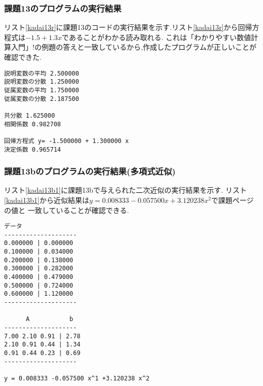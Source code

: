 \documentclass[a4j]{jarticle}
\begin{document}
      \subsubsection{課題13のプログラムの実行結果}
      リスト\ref{kadai13r}に課題13のコードの実行結果を示す.リスト\ref{kadai13r}から回帰方程式は$-1.5+1.3x$であることがわかる読み取れる.
      これは「わかりやすい数値計算入門」!の例題の答えと一致しているから,作成したプログラムが正しいことが確認できた.
      \begin{lstlisting}[basicstyle=\ttfamily\footnotesize, frame=single,label=kadai13r,caption=課題13のプログラムの実行結果]
説明変数の平均 2.500000
説明変数の分散 1.250000
従属変数の平均 1.750000
従属変数の分散 2.187500

共分散 1.625000
相関係数 0.982708

回帰方程式 y= -1.500000 + 1.300000 x
決定係数 0.965714
      \end{lstlisting}

      \subsubsection{課題13bのプログラムの実行結果(多項式近似)}
      リスト\ref{kadai13b1}に課題13bで与えられた二次近似の実行結果を示す.
      リスト\ref{kadai13b1}から近似結果は$y = 0.008333 -0.057500 x +3.120238 x^2$で課題ページの値と
      一致していることが確認できる.
      \begin{lstlisting}[basicstyle=\ttfamily\footnotesize, frame=single,label=kadai13b1,caption=課題13bのプログラムの実行結果(多項式近似)]
       データ       
--------------------
0.000000 | 0.000000 
0.100000 | 0.034000 
0.200000 | 0.138000 
0.300000 | 0.282000 
0.400000 | 0.479000 
0.500000 | 0.724000 
0.600000 | 1.120000 
--------------------

      A           b 
--------------------
7.00 2.10 0.91 | 2.78
2.10 0.91 0.44 | 1.34
0.91 0.44 0.23 | 0.69
--------------------

y = 0.008333 -0.057500 x^1 +3.120238 x^2 
      \end{lstlisting}
\end{document}
